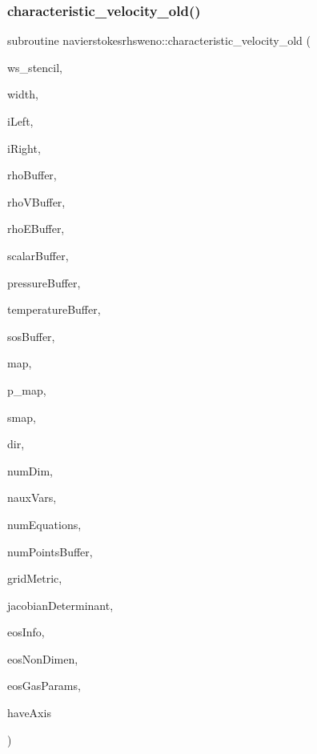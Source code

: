 \subsubsection{\texorpdfstring{characteristic\+\_\+velocity\+\_\+old()}{characteristic\_velocity\_old()}}
{\footnotesize\ttfamily subroutine navierstokesrhsweno\+::characteristic\+\_\+velocity\+\_\+old (\begin{DoxyParamCaption}\item[{real(kind=8), dimension(\hyperlink{namespacenavierstokesrhsweno_af00ac01da0553acc8e7382cfc4a5ca1b}{width}+1,numequations), intent(out)}]{ws\+\_\+stencil,  }\item[{integer(kind=4)}]{width,  }\item[{integer(kind=4)}]{i\+Left,  }\item[{integer(kind=4)}]{i\+Right,  }\item[{real(kind=8), dimension(numpointsbuffer), intent(in)}]{rho\+Buffer,  }\item[{real(kind=8), dimension(numdim$\ast$numpointsbuffer), intent(in), target}]{rho\+V\+Buffer,  }\item[{real(kind=8), dimension(numpointsbuffer), intent(in)}]{rho\+E\+Buffer,  }\item[{real(kind=8), dimension(nauxvars$\ast$numpointsbuffer), intent(in), target}]{scalar\+Buffer,  }\item[{real(kind=8), dimension(numpointsbuffer), intent(in)}]{pressure\+Buffer,  }\item[{real(kind=8), dimension(numpointsbuffer), intent(in)}]{temperature\+Buffer,  }\item[{real(kind=8), dimension(numpointsbuffer), intent(in)}]{sos\+Buffer,  }\item[{integer(kind=4)}]{map,  }\item[{integer(kind=8), dimension(\+:)}]{p\+\_\+map,  }\item[{real(kind=8), dimension(\+:,\+:)}]{smap,  }\item[{integer(kind=4)}]{dir,  }\item[{integer(kind=4)}]{num\+Dim,  }\item[{integer(kind=4)}]{naux\+Vars,  }\item[{integer(kind=4)}]{num\+Equations,  }\item[{integer(kind=8)}]{num\+Points\+Buffer,  }\item[{real(kind=8), dimension(numdim$\ast$numdim$\ast$numpointsbuffer)}]{grid\+Metric,  }\item[{real(kind=8), dimension(numpointsbuffer)}]{jacobian\+Determinant,  }\item[{integer(kind=8), dimension(numgasinfos)}]{eos\+Info,  }\item[{real(kind=8), dimension(numnondimens), intent(in)}]{eos\+Non\+Dimen,  }\item[{real(kind=8), dimension(numgasparams$\ast$(nauxvars+1)), intent(in)}]{eos\+Gas\+Params,  }\item[{integer(kind=4)}]{have\+Axis }\end{DoxyParamCaption})}




